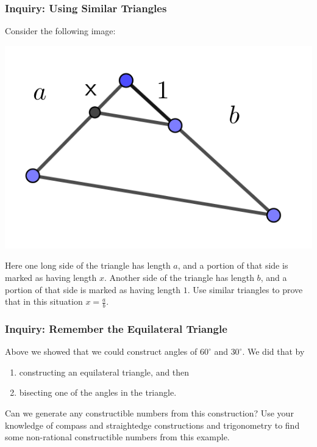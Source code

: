 \documentclass[11pt]{article}
\newenvironment{task}
	{\begin{mdframed}[linecolor=lightgray, linewidth=3pt]\raggedright}
	{\end{mdframed}}
\theoremstyle{definition}
\begin{document}
\subsubsection{Inquiry: Using Similar Triangles}
\begin{task}
  Consider the following image:
  \begin{center}
    \includegraphics[scale=1]{Images/a_over_b.png}
  \end{center}
  Here one long side of the triangle has length $a$, and a portion of that side is marked as having length $x$. Another side of the
  triangle has length $b$, and a portion of that side is marked as having length $1$. Use similar triangles to prove that in this situation $x = \frac{a}{b}$.
\end{task}\newpage

\subsubsection{Inquiry: Remember the Equilateral Triangle}
\begin{task}
  Above we showed that we could construct angles of $60^\circ$ and $30^\circ$. We did that by
  \begin{enumerate}
    \item constructing an equilateral triangle, and then
    \item bisecting one of the angles in the triangle.
  \end{enumerate}
  Can we generate any constructible numbers from this construction? Use your knowledge of compass and straightedge constructions and trigonometry
  to find some non-rational constructible numbers from this example.
\end{task}\newpage
\end{document}
